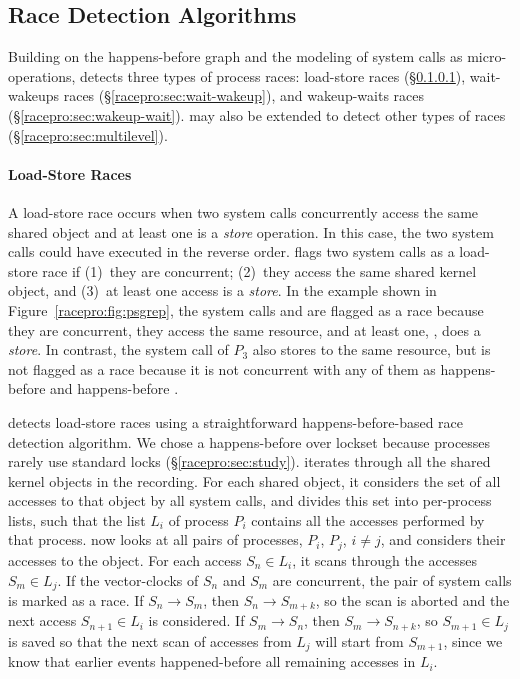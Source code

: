 \subsection{Race Detection Algorithms} \label{racepro:sec:potential}

Building on the happens-before graph and the modeling of system calls
as micro-operations, \racepro detects three types of process races:
load-store races (\S\ref{racepro:sec:load-store}), wait-wakeups races
(\S\ref{racepro:sec:wait-wakeup}), and wakeup-waits races
(\S\ref{racepro:sec:wakeup-wait}).  \racepro may also be extended to detect
other types of races (\S\ref{racepro:sec:multilevel}).

\paragraph{Load-Store Races} \label{racepro:sec:load-store}

A load-store race occurs when two system calls concurrently access the
same shared object and at least one is a \emph{store} operation. In this
case, the two system calls could have executed in the reverse order.
\racepro flags two system calls as a load-store race if (1)~they are
concurrent; (2)~they access the same shared kernel object, and (3)~at
least one access is a \emph{store}. In the 
example shown in Figure~\ref{racepro:fig:psgrep}, the system calls
 and  are flagged as a race because they are
concurrent, they access the same resource, and at least one,
, does a \emph{store}. In contrast, the system call 
 of $P_3$ also stores to the same resource, but is not
flagged as a race because it is not concurrent with any of them as 
 happens-before  and  happens-before
. 

\racepro detects load-store races using a straightforward happens-before-based
race detection algorithm. We chose a happens-before over
lockset because processes rarely use standard locks (\S\ref{racepro:sec:study}). 
\racepro iterates through all the shared kernel objects in the
recording.  For each shared object, it considers the set of all
accesses to that object by all system calls, and divides this set into
per-process lists, such that the list $L_i$ of process $P_i$ contains
all the accesses performed by that process. \racepro now looks at all
pairs of processes, $P_i$, $P_j$, $i \neq j$, and considers their
accesses to the object. For each access $S_n \in L_i$, it scans
through the accesses $S_m \in L_j$.  If the vector-clocks of $S_n$ and
$S_m$ are concurrent, the pair of system calls is marked as a race. If
$S_n \rightarrow S_m$, then $S_n \rightarrow S_{m+k}$, so the scan is
aborted and the next access $S_{n+1} \in L_i$ is considered. If $S_m
\rightarrow S_n$, then $S_m \rightarrow S_{n+k}$, so $S_{m+1} \in L_j$
is saved so that the next scan of accesses from $L_j$ will start from
$S_{m+1}$, since we know that earlier events happened-before all
remaining accesses in $L_i$.

